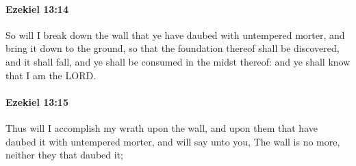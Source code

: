 		\paragraph{Ezekiel 13:14} %
			\label{EZEKIEL-13-14}

			So will I break down the wall that ye have daubed with untempered morter, and bring it down to the ground, so that the foundation thereof shall be discovered, and it shall fall, and ye shall be consumed in the midst thereof: and ye shall know that I am the LORD.


		\paragraph{Ezekiel 13:15} %
			\label{EZEKIEL-13-15}

			Thus will I accomplish my wrath upon the wall, and upon them that have daubed it with untempered morter, and will say unto you, The wall is no more, neither they that daubed it;

